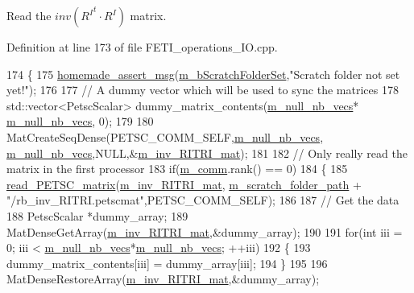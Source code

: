 Read the $ inv({R^I}^t \cdot R^I)$ matrix. 



Definition at line 173 of file F\+E\+T\+I\+\_\+operations\+\_\+\+I\+O.\+cpp.


\begin{DoxyCode}
174 \{
175     \hyperlink{common__header_8h_a593ccc80b790b2268653fcf6597bf451}{homemade\_assert\_msg}(\hyperlink{classcarl_1_1_f_e_t_i___operations_a8bb9de7de35a2f7d7d5982ae1085ba15}{m\_bScratchFolderSet},\textcolor{stringliteral}{"Scratch folder not set
       yet!"});
176     
177     \textcolor{comment}{// A dummy vector which will be used to sync the matrices}
178     std::vector<PetscScalar> dummy\_matrix\_contents(\hyperlink{classcarl_1_1_f_e_t_i___operations_a6be71b08544858c4b4609bf2a2927a17}{m\_null\_nb\_vecs}*
      \hyperlink{classcarl_1_1_f_e_t_i___operations_a6be71b08544858c4b4609bf2a2927a17}{m\_null\_nb\_vecs}, 0);
179 
180     MatCreateSeqDense(PETSC\_COMM\_SELF,\hyperlink{classcarl_1_1_f_e_t_i___operations_a6be71b08544858c4b4609bf2a2927a17}{m\_null\_nb\_vecs},
      \hyperlink{classcarl_1_1_f_e_t_i___operations_a6be71b08544858c4b4609bf2a2927a17}{m\_null\_nb\_vecs},NULL,&\hyperlink{classcarl_1_1_f_e_t_i___operations_a5b61754f3ea2e4c674fd37f18ec0014b}{m\_inv\_RITRI\_mat});
181 
182     \textcolor{comment}{// Only really read the matrix in the first processor}
183     \textcolor{keywordflow}{if}(\hyperlink{classcarl_1_1_f_e_t_i___operations_a8cb0ed286667fc9f3ebc2d8ef2a3e13b}{m\_comm}.rank() == 0)
184     \{
185         \hyperlink{namespacecarl_ac9086ba3b6072efdbafaaa5ae53927de}{read\_PETSC\_matrix}(\hyperlink{classcarl_1_1_f_e_t_i___operations_a5b61754f3ea2e4c674fd37f18ec0014b}{m\_inv\_RITRI\_mat},
      \hyperlink{classcarl_1_1_f_e_t_i___operations_ad6d35bc9b5221d45452fbc8931f22055}{m\_scratch\_folder\_path} + \textcolor{stringliteral}{"/rb\_inv\_RITRI.petscmat"},PETSC\_COMM\_SELF);
186 
187         \textcolor{comment}{// Get the data}
188         PetscScalar *dummy\_array;
189         MatDenseGetArray(\hyperlink{classcarl_1_1_f_e_t_i___operations_a5b61754f3ea2e4c674fd37f18ec0014b}{m\_inv\_RITRI\_mat},&dummy\_array);
190 
191         \textcolor{keywordflow}{for}(\textcolor{keywordtype}{int} iii = 0; iii < \hyperlink{classcarl_1_1_f_e_t_i___operations_a6be71b08544858c4b4609bf2a2927a17}{m\_null\_nb\_vecs}*\hyperlink{classcarl_1_1_f_e_t_i___operations_a6be71b08544858c4b4609bf2a2927a17}{m\_null\_nb\_vecs}; ++iii)
192         \{
193             dummy\_matrix\_contents[iii] = dummy\_array[iii];
194         \}
195 
196         MatDenseRestoreArray(\hyperlink{classcarl_1_1_f_e_t_i___operations_a5b61754f3ea2e4c674fd37f18ec0014b}{m\_inv\_RITRI\_mat},&dummy\_array);

\end{DoxyCode}
